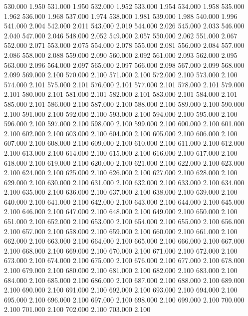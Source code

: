 530.000 1.950 
531.000 1.950 
532.000 1.952 
533.000 1.954 
534.000 1.958 
535.000 1.962 
536.000 1.968 
537.000 1.974 
538.000 1.981 
539.000 1.988 
540.000 1.996 
541.000 2.004 
542.000 2.011 
543.000 2.019 
544.000 2.026 
545.000 2.033 
546.000 2.040 
547.000 2.046 
548.000 2.052 
549.000 2.057 
550.000 2.062 
551.000 2.067 
552.000 2.071 
553.000 2.075 
554.000 2.078 
555.000 2.081 
556.000 2.084 
557.000 2.086 
558.000 2.088 
559.000 2.090 
560.000 2.092 
561.000 2.093 
562.000 2.095 
563.000 2.096 
564.000 2.097 
565.000 2.097 
566.000 2.098 
567.000 2.099 
568.000 2.099 
569.000 2.100 
570.000 2.100 
571.000 2.100 
572.000 2.100 
573.000 2.100 
574.000 2.101 
575.000 2.101 
576.000 2.101 
577.000 2.101 
578.000 2.101 
579.000 2.101 
580.000 2.101 
581.000 2.101 
582.000 2.101 
583.000 2.101 
584.000 2.101 
585.000 2.101 
586.000 2.100 
587.000 2.100 
588.000 2.100 
589.000 2.100 
590.000 2.100 
591.000 2.100 
592.000 2.100 
593.000 2.100 
594.000 2.100 
595.000 2.100 
596.000 2.100 
597.000 2.100 
598.000 2.100 
599.000 2.100 
600.000 2.100 
601.000 2.100 
602.000 2.100 
603.000 2.100 
604.000 2.100 
605.000 2.100 
606.000 2.100 
607.000 2.100 
608.000 2.100 
609.000 2.100 
610.000 2.100 
611.000 2.100 
612.000 2.100 
613.000 2.100 
614.000 2.100 
615.000 2.100 
616.000 2.100 
617.000 2.100 
618.000 2.100 
619.000 2.100 
620.000 2.100 
621.000 2.100 
622.000 2.100 
623.000 2.100 
624.000 2.100 
625.000 2.100 
626.000 2.100 
627.000 2.100 
628.000 2.100 
629.000 2.100 
630.000 2.100 
631.000 2.100 
632.000 2.100 
633.000 2.100 
634.000 2.100 
635.000 2.100 
636.000 2.100 
637.000 2.100 
638.000 2.100 
639.000 2.100 
640.000 2.100 
641.000 2.100 
642.000 2.100 
643.000 2.100 
644.000 2.100 
645.000 2.100 
646.000 2.100 
647.000 2.100 
648.000 2.100 
649.000 2.100 
650.000 2.100 
651.000 2.100 
652.000 2.100 
653.000 2.100 
654.000 2.100 
655.000 2.100 
656.000 2.100 
657.000 2.100 
658.000 2.100 
659.000 2.100 
660.000 2.100 
661.000 2.100 
662.000 2.100 
663.000 2.100 
664.000 2.100 
665.000 2.100 
666.000 2.100 
667.000 2.100 
668.000 2.100 
669.000 2.100 
670.000 2.100 
671.000 2.100 
672.000 2.100 
673.000 2.100 
674.000 2.100 
675.000 2.100 
676.000 2.100 
677.000 2.100 
678.000 2.100 
679.000 2.100 
680.000 2.100 
681.000 2.100 
682.000 2.100 
683.000 2.100 
684.000 2.100 
685.000 2.100 
686.000 2.100 
687.000 2.100 
688.000 2.100 
689.000 2.100 
690.000 2.100 
691.000 2.100 
692.000 2.100 
693.000 2.100 
694.000 2.100 
695.000 2.100 
696.000 2.100 
697.000 2.100 
698.000 2.100 
699.000 2.100 
700.000 2.100 
701.000 2.100 
702.000 2.100 
703.000 2.100 
